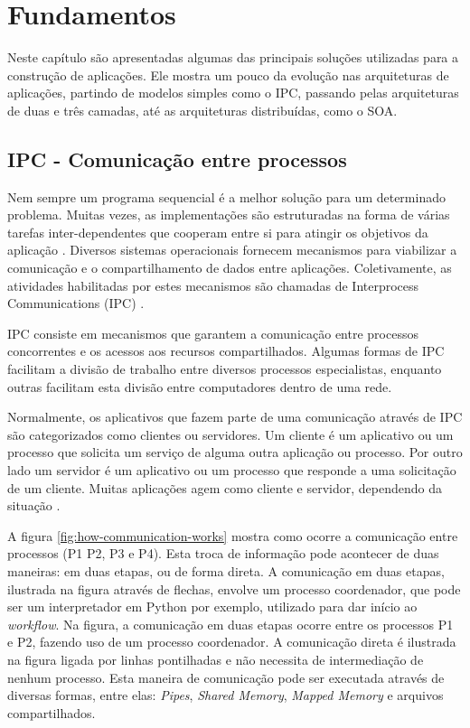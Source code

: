 \chapter[Fundamentos]{Fundamentos}

Neste capítulo são apresentadas algumas das principais soluções utilizadas para a construção de aplicações. Ele mostra um pouco da evolução nas arquiteturas de aplicações, partindo de modelos simples como o IPC, passando pelas arquiteturas de duas e três camadas, até as arquiteturas distribuídas, como o SOA. 


\section{IPC - Comunicação entre processos}\label{sec:ipc}

Nem sempre um programa sequencial é a melhor solução para um determinado problema. Muitas vezes, as implementações são estruturadas na forma de várias tarefas inter-dependentes que cooperam entre si para atingir os objetivos da aplicação \cite{sistemas-op-mazierro}. Diversos sistemas operacionais fornecem mecanismos para viabilizar a comunicação e o compartilhamento de dados entre aplicações. Coletivamente, as atividades habilitadas por estes mecanismos são chamadas de Interprocess Communications (IPC) \cite{microsoft-ipc}.

IPC consiste em mecanismos que garantem a comunicação entre processos concorrentes e os acessos aos recursos compartilhados. Algumas formas de IPC facilitam a divisão de trabalho entre diversos processos especialistas, enquanto outras facilitam esta divisão entre computadores dentro de uma rede.

Normalmente, os aplicativos que fazem parte de uma comunicação através de IPC são categorizados como clientes ou servidores. Um cliente é um aplicativo ou um processo que solicita um serviço de alguma outra aplicação ou processo. Por outro lado um servidor é um aplicativo ou um processo que responde a uma solicitação de um cliente. Muitas aplicações agem como cliente e servidor, dependendo da situação \cite{microsoft-ipc}.

A figura \ref{fig:how-communication-works} mostra como ocorre a comunicação entre processos (P1 P2, P3 e P4). Esta troca de informação pode acontecer de duas maneiras: em duas etapas, ou de forma direta. A comunicação em duas etapas, ilustrada na figura através de flechas, envolve um processo coordenador, que pode ser um interpretador em Python por exemplo, utilizado para dar início ao \textit{workflow}. Na figura, a comunicação em duas etapas ocorre entre os processos P1 e P2, fazendo uso de um processo coordenador. A comunicação direta é ilustrada na figura ligada por linhas pontilhadas e não necessita de intermediação de nenhum processo. Esta maneira de comunicação pode ser executada através de diversas formas, entre elas: \textit{Pipes}, \textit{Shared Memory}, \textit{Mapped Memory} e arquivos compartilhados.


